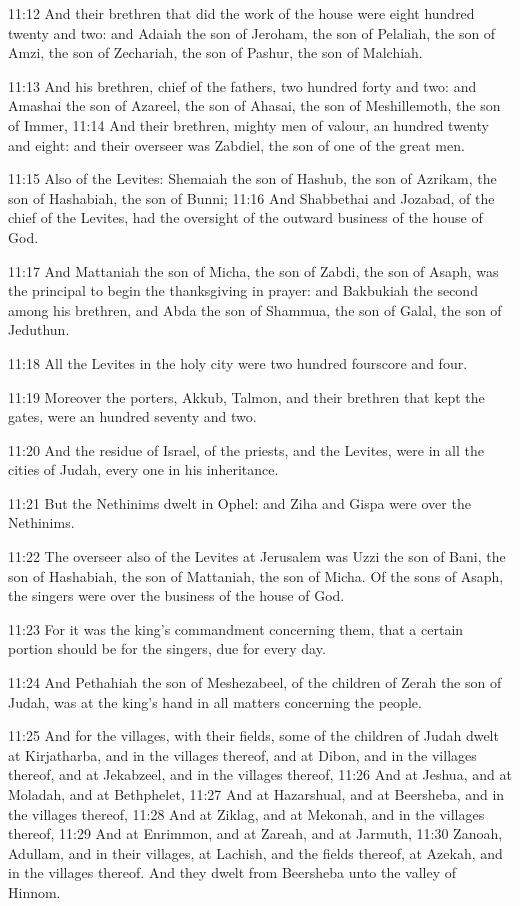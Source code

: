 11:12 And their brethren that did the work of the house were eight
hundred twenty and two: and Adaiah the son of Jeroham, the son of
Pelaliah, the son of Amzi, the son of Zechariah, the son of Pashur,
the son of Malchiah.

11:13 And his brethren, chief of the fathers, two hundred forty and
two: and Amashai the son of Azareel, the son of Ahasai, the son of
Meshillemoth, the son of Immer, 11:14 And their brethren, mighty men
of valour, an hundred twenty and eight: and their overseer was
Zabdiel, the son of one of the great men.

11:15 Also of the Levites: Shemaiah the son of Hashub, the son of
Azrikam, the son of Hashabiah, the son of Bunni; 11:16 And Shabbethai
and Jozabad, of the chief of the Levites, had the oversight of the
outward business of the house of God.

11:17 And Mattaniah the son of Micha, the son of Zabdi, the son of
Asaph, was the principal to begin the thanksgiving in prayer: and
Bakbukiah the second among his brethren, and Abda the son of Shammua,
the son of Galal, the son of Jeduthun.

11:18 All the Levites in the holy city were two hundred fourscore and
four.

11:19 Moreover the porters, Akkub, Talmon, and their brethren that
kept the gates, were an hundred seventy and two.

11:20 And the residue of Israel, of the priests, and the Levites, were
in all the cities of Judah, every one in his inheritance.

11:21 But the Nethinims dwelt in Ophel: and Ziha and Gispa were over
the Nethinims.

11:22 The overseer also of the Levites at Jerusalem was Uzzi the son
of Bani, the son of Hashabiah, the son of Mattaniah, the son of Micha.
Of the sons of Asaph, the singers were over the business of the house
of God.

11:23 For it was the king's commandment concerning them, that a
certain portion should be for the singers, due for every day.

11:24 And Pethahiah the son of Meshezabeel, of the children of Zerah
the son of Judah, was at the king's hand in all matters concerning the
people.

11:25 And for the villages, with their fields, some of the children of
Judah dwelt at Kirjatharba, and in the villages thereof, and at Dibon,
and in the villages thereof, and at Jekabzeel, and in the villages
thereof, 11:26 And at Jeshua, and at Moladah, and at Bethphelet, 11:27
And at Hazarshual, and at Beersheba, and in the villages thereof,
11:28 And at Ziklag, and at Mekonah, and in the villages thereof,
11:29 And at Enrimmon, and at Zareah, and at Jarmuth, 11:30 Zanoah,
Adullam, and in their villages, at Lachish, and the fields thereof, at
Azekah, and in the villages thereof. And they dwelt from Beersheba
unto the valley of Hinnom.


